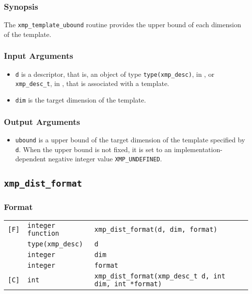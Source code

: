 \subsubsection*{Synopsis}

The {\tt xmp\_template\_ubound} routine provides the upper bound of each
dimension of the template.

\subsubsection*{Input Arguments}
\begin{itemize}
 \item {\tt d} is a descriptor, that is, an object of type 
       {\tt type(xmp\_desc)}, in {\XMPF}, or {\tt xmp\_desc\_t},
       in {\XMPC}, that is associated with a template.
 \item {\tt dim} is the target dimension of the template.
\end{itemize}

\subsubsection*{Output Arguments}
\begin{itemize}
 \item {\tt ubound} is a upper bound of the target dimension of the
       template specified by {\tt d}. When the upper bound is not fixed,
       it is set to an implementation-dependent negative integer value
       {\tt XMP\_UNDEFINED}.

\end{itemize}


\subsection{\tt xmp\_dist\_format}

\subsubsection*{Format}

\begin{tabular}{lll}

\verb![F]!& {\tt integer function}& {\tt xmp\_dist\_format(d, dim, format)}\\
          & {\tt type(xmp\_desc)} & {\tt d}\\
          & {\tt integer} & {\tt dim}\\
          & {\tt integer} & {\tt format}\\

\verb![C]!&  {\tt int}& {\tt xmp\_dist\_format(xmp\_desc\_t d, int dim, int *format)}\\

\end{tabular}

